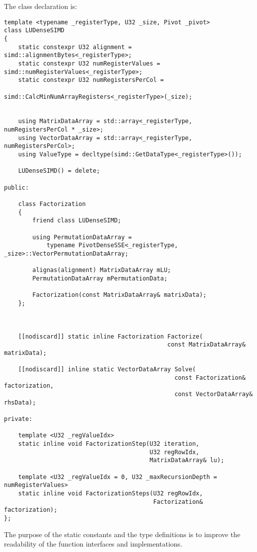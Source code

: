 The class declaration is:

\begin{verbatim}
template <typename _registerType, U32 _size, Pivot _pivot>
class LUDenseSIMD
{
    static constexpr U32 alignment = simd::alignmentBytes<_registerType>;
    static constexpr U32 numRegisterValues = simd::numRegisterValues<_registerType>;
    static constexpr U32 numRegistersPerCol = 
                             simd::CalcMinNumArrayRegisters<_registerType>(_size);


    using MatrixDataArray = std::array<_registerType, numRegistersPerCol * _size>;
    using VectorDataArray = std::array<_registerType, numRegistersPerCol>;
    using ValueType = decltype(simd::GetDataType<_registerType>());

    LUDenseSIMD() = delete;

public:

    class Factorization
    {
        friend class LUDenseSIMD;

        using PermutationDataArray = 
            typename PivotDenseSSE<_registerType, _size>::VectorPermutationDataArray;

        alignas(alignment) MatrixDataArray mLU;
        PermutationDataArray mPermutationData;

        Factorization(const MatrixDataArray& matrixData);
    };



    [[nodiscard]] static inline Factorization Factorize(
                                              const MatrixDataArray& matrixData);

    [[nodiscard]] inline static VectorDataArray Solve(
                                                const Factorization& factorization,
                                                const VectorDataArray& rhsData);

private:

    template <U32 _regValueIdx>
    static inline void FactorizationStep(U32 iteration, 
                                         U32 regRowIdx, 
                                         MatrixDataArray& lu);

    template <U32 _regValueIdx = 0, U32 _maxRecursionDepth = numRegisterValues>
    static inline void FactorizationSteps(U32 regRowIdx, 
                                          Factorization& factorization);
};
\end{verbatim}

The purpose of the static constants and the type definitions is to improve the readability of the function interfaces and implementations.

